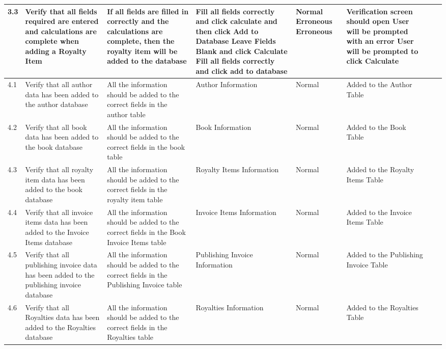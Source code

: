 \begin{landscape}
\begin{center}
\begin{longtable}{|p{1.5cm}|p{2.5cm}|p{2.5cm}|p{2cm}|p{2cm}|p{2cm}|p{2cm}|p{2cm}|}
        3.3 & Verify that all fields required are entered and calculations are complete when adding a Royalty Item & If all fields are filled in correctly and the calculations are complete, then the royalty item will be added to the database & Fill all fields correctly and click calculate and then click Add to Database \newline Leave Fields Blank and click Calculate \newline Fill all fields correctly and click add to database & Normal \newline Erroneous \newline Erroneous & Verification screen should open \newline User will be prompted with an error \newline User will be prompted to click Calculate & & \\ \hline
        4.1 & Verify that all author data has been added to the author database & All the information should be added to the correct fields in the author table & Author Information & Normal & Added to the Author Table & & \\ \hline
        4.2 & Verify that all book data has been added to the book database & All the information should be added to the correct fields in the book table & Book Information & Normal & Added to the Book Table & & \\ \hline
        4.3 & Verify that all royalty item data has been added to the book database & All the information should be added to the correct fields in the royalty item table & Royalty Items Information & Normal & Added to the Royalty Items Table & & \\ \hline
        4.4 & Verify that all invoice items data has been added to the Invoice Items database & All the information should be added to the correct fields in the Book Invoice Items table & Invoice Items Information & Normal & Added to the Invoice Items Table & & \\ \hline
        4.5 & Verify that all publishing invoice data has been added to the publishing invoice database & All the information should be added to the correct fields in the Publishing Invoice table & Publishing Invoice Information & Normal & Added to the Publishing Invoice Table & & \\ \hline
        4.6 & Verify that all Royalties data has been added to the Royalties database & All the information should be added to the correct fields in the Royalties table & Royalties Information & Normal & Added to the Royalties Table & & \\ \hline

\end{longtable}
\end{center}
\end{landscape}

